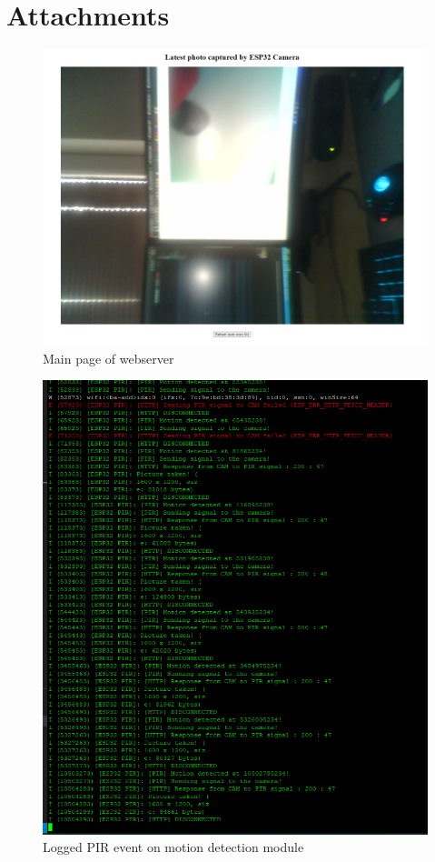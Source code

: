 \documentclass{article}
\begin{document}
    \section{Attachments}
    \begin{figure}[h!]
        \centering
        \includegraphics[scale=0.35,keepaspectratio]{img/webservermain.png}
        \caption{Main page of webserver}\label{pic:webserverindex}
    \end{figure} 
    \begin{figure}[h!]
        \centering
        \includegraphics[scale=0.43,keepaspectratio]{img/pirevent.png}
        \caption{Logged PIR event on motion detection module}\label{pic:pireventlog}
    \end{figure} 
    \clearpage
	
\end{document}
